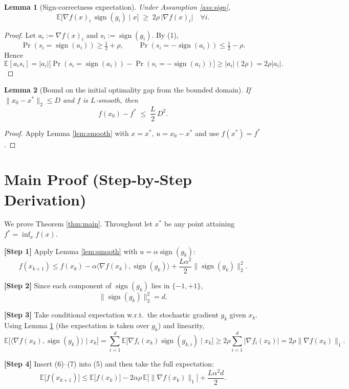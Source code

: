 \documentclass{article}
\newtheorem{lemma}{Lemma}
\newcommand{\sign}{\operatorname{sign}}
\newcommand{\E}{\mathbb{E}}
\begin{document}
\begin{lemma}[Sign‑correctness expectation]\label{lem:signexp}
Under Assumption \ref{ass:sign},
\[
\E\!\bigl[\nabla f(x)_i\,\sign(g_i)\mid x\bigr]\;\ge\;2\rho\,\bigl|\nabla f(x)_i\bigr|
\quad\forall i.
\tag{3}
\]
\end{lemma}
\begin{proof}
Let $a_i:=\nabla f(x)_i$ and $s_i:=\sign(g_i)$.  By (1),
\[
\Pr(s_i=\sign(a_i))\ge\tfrac12+\rho,\qquad
\Pr(s_i=-\sign(a_i))\le\tfrac12-\rho .
\]
Hence
\[
\E[a_i s_i]
=|a_i|\bigl[\Pr(s_i=\sign(a_i))-\Pr(s_i=-\sign(a_i))\bigr]
\ge|a_i|(2\rho)=2\rho|a_i|.
\]
\end{proof}

\begin{lemma}[Bound on the initial optimality gap from the bounded domain]\label{lem:gap}
If $\|x_0-x^{*}\|_{2}\le D$ and $f$ is $L$‑smooth, then
\[
f(x_0)-f^{*}\;\le\;\frac{L}{2}\,D^{2}.
\tag{4}
\]
\end{lemma}
\begin{proof}
Apply Lemma \ref{lem:smooth} with $x=x^{*}$, $u=x_0-x^{*}$ and use $f(x^{*})=f^{*}$.
\end{proof}

\section*{Main Proof (Step‑by‑Step Derivation)}
We prove Theorem \ref{thm:main}.  Throughout let $x^{*}$ be any point attaining $f^{*}=\inf_{x}f(x)$.

\bigskip
\noindent\textbf{[Step 1]} Apply Lemma \ref{lem:smooth} with $u=\alpha\sign(g_k)$:
\[
f(x_{k+1})\le f(x_k)-\alpha\langle\nabla f(x_k),\sign(g_k)\rangle
               +\frac{L\alpha^{2}}{2}\|\sign(g_k)\|_{2}^{2}.
\tag{5}
\]

\noindent\textbf{[Step 2]} Since each component of $\sign(g_k)$ lies in $\{-1,+1\}$,
\[
\|\sign(g_k)\|_{2}^{2}=d.
\tag{6}
\]

\noindent\textbf{[Step 3]} Take conditional expectation w.r.t.\ the stochastic gradient $g_k$ given $x_k$.
Using Lemma \ref{lem:signexp} (the expectation is taken over $g_k$) and linearity,
\[
\E\!\bigl[\langle\nabla f(x_k),\sign(g_k)\rangle\mid x_k\bigr]
   =\sum_{i=1}^{d}\E\!\bigl[\nabla f_i(x_k)\sign(g_{k,i})\mid x_k\bigr]
   \ge 2\rho\sum_{i=1}^{d}|\nabla f_i(x_k)|
   =2\rho\|\nabla f(x_k)\|_{1}.
\tag{7}
\]

\noindent\textbf{[Step 4]} Insert (6)–(7) into (5) and then take the full expectation:
\[
\E\bigl[f(x_{k+1})\bigr]
\le \E\bigl[f(x_k)\bigr]
   -2\alpha\rho\,\E\!\bigl[\|\nabla f(x_k)\|_{1}\bigr]
   +\frac{L\alpha^{2}d}{2}.
\tag{8}
\]
\end{document}
